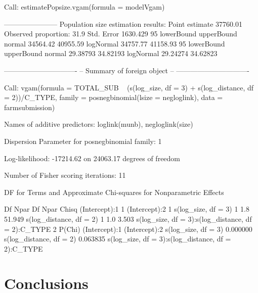 \documentclass[
]{jss}
\newcommand{\1}{\mathcal{I}} \newcommand{\bZero}{\boldsymbol{0}}
\begin{document}
\begin{CodeChunk}
\begin{CodeOutput}
Call:
estimatePopsize.vgam(formula = modelVgam)

-----------------------
Population size estimation results: 
Point estimate 37760.01
Observed proportion: 31.9%
Std. Error 1630.429
95%
          lowerBound upperBound
normal      34564.42   40955.59
logNormal   34757.77   41158.93
95%
          lowerBound upperBound
normal      29.38793   34.82193
logNormal   29.24274   34.62823

-------------------------------
-- Summary of foreign object --
-------------------------------

Call:
vgam(formula = TOTAL_SUB ~ (s(log_size, df = 3) + s(log_distance, 
    df = 2))/C_TYPE, family = posnegbinomial(lsize = negloglink), 
    data = farmsubmission)

Names of additive predictors: loglink(munb), negloglink(size)

Dispersion Parameter for posnegbinomial family:   1

Log-likelihood: -17214.62 on 24063.17 degrees of freedom

Number of Fisher scoring iterations:  11 

DF for Terms and Approximate Chi-squares for Nonparametric Effects

                                                   Df Npar Df Npar Chisq
(Intercept):1                                       1                   
(Intercept):2                                       1                   
s(log_size, df = 3)                                 1     1.8     51.949
s(log_distance, df = 2)                             1     1.0      3.503
s(log_size, df = 3):s(log_distance, df = 2):C_TYPE  2                   
                                                     P(Chi)
(Intercept):1                                              
(Intercept):2                                              
s(log_size, df = 3)                                0.000000
s(log_distance, df = 2)                            0.063835
s(log_size, df = 3):s(log_distance, df = 2):C_TYPE         
\end{CodeOutput}
\end{CodeChunk}

\normalsize

\section{Conclusions}
\end{document}
